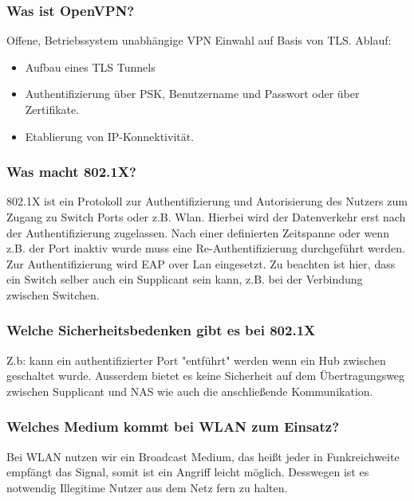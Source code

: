 		\subsubsection{Was ist OpenVPN?}
		Offene, Betriebssystem unabhängige VPN Einwahl auf Basis von TLS.
		Ablauf:
		\begin{itemize}
			\item Aufbau eines TLS Tunnels
			\item Authentifizierung über PSK, Benutzername und Passwort oder über Zertifikate.
			\item Etablierung von IP-Konnektivität.
		\end{itemize}
		
		\subsubsection{Was macht 802.1X?}
		802.1X ist ein Protokoll zur Authentifizierung und Autorisierung des Nutzers  zum Zugang zu Switch Ports oder z.B. Wlan. Hierbei wird der Datenverkehr erst nach der Authentifizierung zugelassen. Nach einer definierten Zeitspanne oder wenn z.B. der Port inaktiv wurde muss eine Re-Authentifizierung durchgeführt werden. Zur Authentifizierung wird EAP over Lan eingesetzt. Zu beachten ist hier, dass ein Switch selber auch ein Supplicant sein kann, z.B. bei der Verbindung zwischen Switchen.
		
		\subsubsection{Welche Sicherheitsbedenken gibt es bei 802.1X}
		Z.b: kann ein authentifizierter Port "entführt" werden wenn ein Hub zwischen geschaltet wurde. Ausserdem bietet es keine Sicherheit auf dem Übertragungsweg zwischen Supplicant und NAS wie auch die anschließende Kommunikation. 
		
		\subsubsection{Welches Medium kommt bei WLAN zum Einsatz?}
		Bei WLAN nutzen wir ein Broadcast Medium, das heißt jeder in Funkreichweite empfängt das Signal, somit ist ein Angriff leicht möglich. Desswegen ist es notwendig Illegitime Nutzer aus dem Netz fern zu halten.
		
